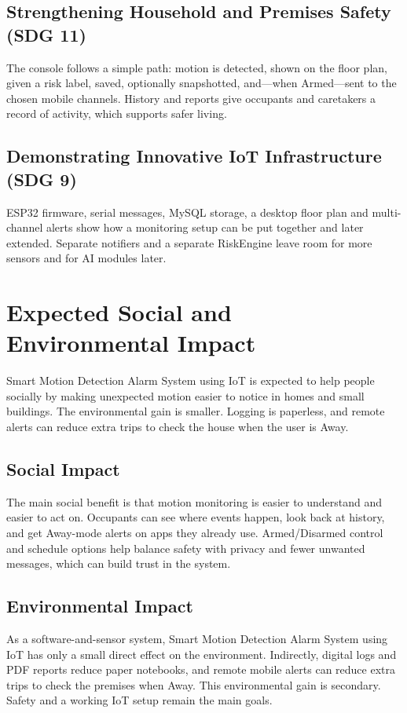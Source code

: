 \documentclass[12pt,a4paper]{report}
\begin{document}
\subsection{Strengthening Household and Premises Safety (SDG 11)}
The console follows a simple path: motion is detected, shown on the floor plan, given a risk label, saved, optionally snapshotted, and---when Armed---sent to the chosen mobile channels. History and reports give occupants and caretakers a record of activity, which supports safer living.

\subsection{Demonstrating Innovative IoT Infrastructure (SDG 9)}
ESP32 firmware, serial messages, MySQL storage, a desktop floor plan and multi-channel alerts show how a monitoring setup can be put together and later extended. Separate notifiers and a separate RiskEngine leave room for more sensors and for AI modules later.

\section{Expected Social and Environmental Impact}

Smart Motion Detection Alarm System using IoT is expected to help people socially by making unexpected motion easier to notice in homes and small buildings. The environmental gain is smaller. Logging is paperless, and remote alerts can reduce extra trips to check the house when the user is Away.

\subsection{Social Impact}
The main social benefit is that motion monitoring is easier to understand and easier to act on. Occupants can see where events happen, look back at history, and get Away-mode alerts on apps they already use. Armed/Disarmed control and schedule options help balance safety with privacy and fewer unwanted messages, which can build trust in the system.

\subsection{Environmental Impact}
As a software-and-sensor system, Smart Motion Detection Alarm System using IoT has only a small direct effect on the environment. Indirectly, digital logs and PDF reports reduce paper notebooks, and remote mobile alerts can reduce extra trips to check the premises when Away. This environmental gain is secondary. Safety and a working IoT setup remain the main goals.
\end{document}
